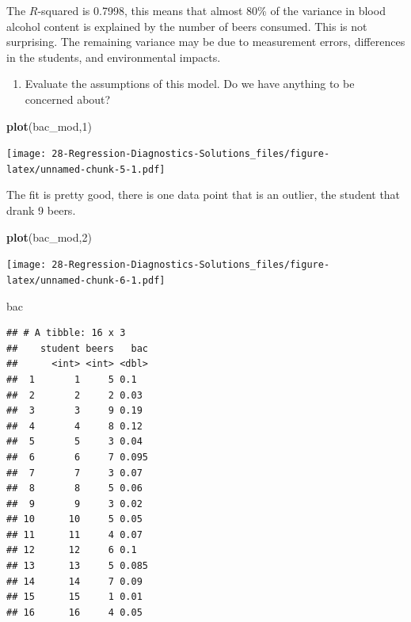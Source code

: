 \documentclass[
]{book}
\newenvironment{Shaded}{\begin{snugshade}}{\end{snugshade}}
\newcommand{\DecValTok}[1]{\textcolor[rgb]{0.00,0.00,0.81}{#1}}
\newcommand{\KeywordTok}[1]{\textcolor[rgb]{0.13,0.29,0.53}{\textbf{#1}}}
\newcommand{\NormalTok}[1]{#1}
\providecommand{\tightlist}{%
  \setlength{\itemsep}{0pt}\setlength{\parskip}{0pt}}
\begin{document}
The \(R\)-squared is 0.7998, this means that almost 80\% of the variance in blood alcohol content is explained by the number of beers consumed. This is not surprising. The remaining variance may be due to measurement errors, differences in the students, and environmental impacts.

\begin{enumerate}
\def\labelenumi{\alph{enumi}.}
\setcounter{enumi}{1}
\tightlist
\item
  Evaluate the assumptions of this model. Do we have anything to be concerned about?
\end{enumerate}

\begin{Shaded}
\begin{Highlighting}[]
\KeywordTok{plot}\NormalTok{(bac_mod,}\DecValTok{1}\NormalTok{)}
\end{Highlighting}
\end{Shaded}

\texttt{[image: 28-Regression-Diagnostics-Solutions\_files/figure-latex/unnamed-chunk-5-1.pdf]}

The fit is pretty good, there is one data point that is an outlier, the student that drank 9 beers.

\begin{Shaded}
\begin{Highlighting}[]
\KeywordTok{plot}\NormalTok{(bac_mod,}\DecValTok{2}\NormalTok{)}
\end{Highlighting}
\end{Shaded}

\texttt{[image: 28-Regression-Diagnostics-Solutions\_files/figure-latex/unnamed-chunk-6-1.pdf]}

\begin{Shaded}
\begin{Highlighting}[]
\NormalTok{bac}
\end{Highlighting}
\end{Shaded}

\begin{verbatim}
## # A tibble: 16 x 3
##    student beers   bac
##      <int> <int> <dbl>
##  1       1     5 0.1  
##  2       2     2 0.03 
##  3       3     9 0.19 
##  4       4     8 0.12 
##  5       5     3 0.04 
##  6       6     7 0.095
##  7       7     3 0.07 
##  8       8     5 0.06 
##  9       9     3 0.02 
## 10      10     5 0.05 
## 11      11     4 0.07 
## 12      12     6 0.1  
## 13      13     5 0.085
## 14      14     7 0.09 
## 15      15     1 0.01 
## 16      16     4 0.05
\end{verbatim}
\end{document}
